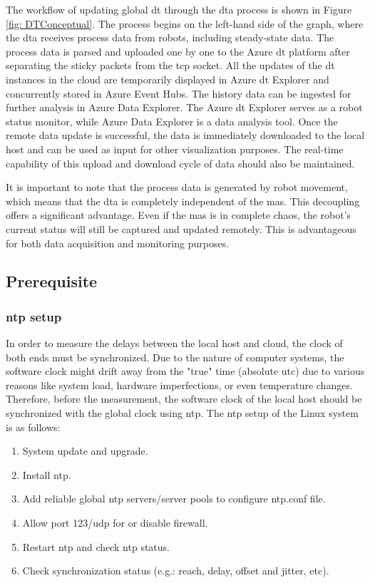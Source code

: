 The workflow of updating global \gls{dt} through the \gls{dta} process is shown 
in Figure \ref{fig: DTConceptual}. The process begins on the left-hand side of the 
graph, where the \gls{dta} receives process data from robots, including steady-state 
data. The process data is parsed and uploaded one by one to the Azure \gls{dt} 
platform after separating the sticky packets from the \gls{tcp} socket.
All the updates of the \gls{dt} instances in the cloud are temporarily displayed 
in Azure \gls{dt} Explorer and concurrently stored in Azure Event Hubs. The history 
data can be ingested for further analysis in Azure Data Explorer. The Azure \gls{dt} 
Explorer serves as a robot status monitor, while Azure Data Explorer is a data analysis tool.
Once the remote data update is successful, the data is immediately downloaded to the local 
host and can be used as input for other visualization purposes. The real-time capability 
of this upload and download cycle of data should also be maintained.

It is important to note that the process data is generated by robot movement, 
which means that the \gls{dta} is completely independent of the \gls{mas}. This decoupling 
offers a 
significant advantage. Even if the \gls{mas} is in complete chaos, the robot's current status 
will still be captured and updated remotely. This is advantageous for both data acquisition 
and monitoring purposes.



\subsection{Prerequisite} \label{chap: ntpsetup}
\subsubsection{\gls{ntp} setup}
In order to measure the delays between the local host and cloud, the clock of both ends must be synchronized. 
Due to the nature of computer systems, the software clock might drift away from the "true" time (absolute \gls{utc}) 
due to various reasons like system load, hardware imperfections, or even temperature changes.
Therefore, before the measurement, the software clock of the local host should be synchronized with the global 
clock using \gls{ntp}. 
The \gls{ntp} setup of the Linux system is as follows:  

\begin{enumerate}
    \item System update and upgrade.
    \item Install \gls{ntp}.
    \item Add reliable global \gls{ntp} servers/server pools to configure ntp.conf file.
    \item Allow port 123/udp for or disable firewall.
    \item Restart \gls{ntp} and check \gls{ntp} status.
    \item Check synchronization status (e.g.: reach, delay, offset and jitter, etc).
    \end{enumerate}

